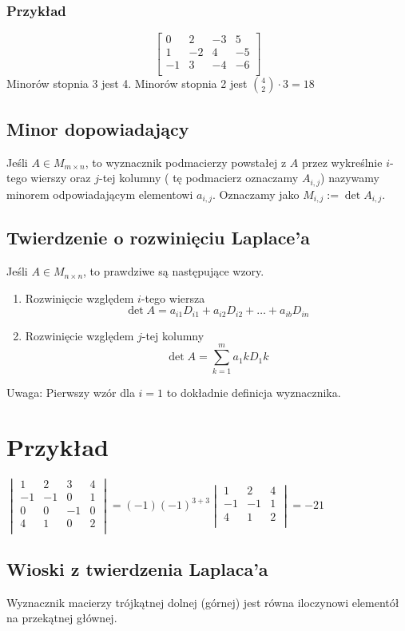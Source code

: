 \documentclass[11pt]{article}
\begin{document}
\subsubsection{Przykład}
$$\begin{bmatrix}
	0 & 2 & -3 & 5\\
	1 & -2 & 4 & -5\\
	-1 & 3 & -4 & -6\\
\end{bmatrix}$$
Minorów stopnia 3 jest 4.
Minorów stopnia 2 jest ${4 \choose 2} \cdot 3 = 18$
\subsection{Minor dopowiadający}
Jeśli $ A \in M_{m \times n}$, to wyznacznik podmacierzy powstałej z $A$ przez wykreślnie $i$-tego wierszy oraz $j$-tej kolumny ( tę podmacierz oznaczamy $A_{i,j}$) nazywamy minorem odpowiadającym elementowi $a_{i,j}$. Oznaczamy jako $M_{i,j} := \det A_{i,j}$.
\subsection{Twierdzenie o rozwinięciu Laplace'a}
Jeśli $A \in M_{n \times n}$, to prawdziwe są następujące wzory.
\begin{enumerate}
\item{Rozwinięcie względem $i$-tego wiersza}
$$ \det A = a_{i1} D_{i1} + a_{i2} D_{i2} + \ldots + a_{ib}D_{in}$$
\item{Rozwinięcie względem $j$-tej kolumny}
$$ \det A = \sum_{k=1}^m{a_1k D_1k} $$
\end{enumerate}
Uwaga: Pierwszy wzór dla $i=1$ to dokładnie definicja wyznacznika.
\section{Przykład}
$\begin{vmatrix}
	1 & 2 & 3 & 4\\
	-1 & -1 & 0 & 1\\
	0 & 0 & -1 & 0\\
	4 & 1 & 0 & 2\\
\end{vmatrix} = ( -1) (-1)^{3+3} \begin{vmatrix}
	1 & 2 & 4\\
	-1 & -1  & 1\\
	4 & 1  & 2\\
\end{vmatrix} = -21
$
\subsection{Wioski z twierdzenia Laplaca'a}
Wyznacznik macierzy trójkątnej dolnej (górnej) jest równa iloczynowi elementół na przekątnej głównej.
\end{document}
